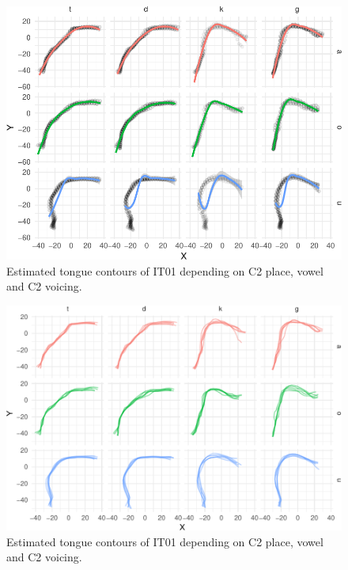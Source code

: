 \documentclass[12pt,]{article}
\begin{document}
\begin{figure}

{\centering \includegraphics[width=\linewidth]{2018-polar-gam_files/figure-latex/smooths-1} 

}

\caption{Estimated tongue contours of IT01 depending on C2 place, vowel and C2 voicing.}\label{f:smooths}
\end{figure}

\begin{figure}

{\centering \includegraphics[width=\linewidth]{2018-polar-gam_files/figure-latex/paths-1} 

}

\caption{Estimated tongue contours of IT01 depending on C2 place, vowel and C2 voicing.}\label{f:paths}
\end{figure}
\end{document}
